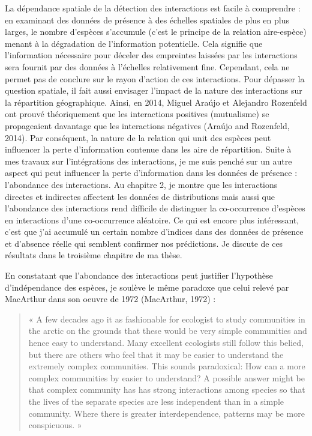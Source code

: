 La dépendance spatiale de la détection des interactions est facile à
comprendre : en examinant des données de présence à des échelles
spatiales de plus en plus larges, le nombre d'espèces s'accumule (c'est
le principe de la relation aire-espèce) menant à la dégradation de
l'information potentielle. Cela signifie que l'information nécessaire
pour déceler des empreintes laissées par les interactions sera fournit
par des données à l'échelles relativement fine. Cependant, cela ne
permet pas de conclure sur le rayon d'action de ces interactions. Pour
dépasser la question spatiale, il fait aussi envisager l'impact de la
nature des interactions sur la répartition géographique. Ainsi, en 2014,
Miguel Araújo et Alejandro Rozenfeld ont prouvé théoriquement que les
interactions positives (mutualisme) se propageaient davantage que les
interactions négatives (Araújo and Rozenfeld, 2014). Par conséquent, la
nature de la relation qui unit des espèces peut influencer la perte
d'information contenue dans les aire de répartition. Suite à mes travaux
sur l'intégrations des interactions, je me suis penché sur un autre
aspect qui peut influencer la perte d'information dans les données de
présence : l'abondance des interactions. Au chapitre 2, je montre que
les interactions directes et indirectes affectent les données de
distributions mais aussi que l'abondance des interactions rend difficile
de distinguer la co-occurrence d'espèces en interactions d'une
co-occurrence aléatoire. Ce qui est encore plus intéressant, c'est que
j'ai accumulé un certain nombre d'indices dans des données de présence
et d'absence réelle qui semblent confirmer nos prédictions. Je discute
de ces résultats dans le troisième chapitre de ma thèse.

En constatant que l'abondance des interactions peut justifier
l'hypothèse d'indépendance des espèces, je soulève le même paradoxe que
celui relevé par MacArthur dans son oeuvre de 1972 (MacArthur, 1972) :

\begin{quote}
« A few decades ago it as fashionable for ecologist to study communities
in the arctic on the grounds that these would be very simple communities
and hence easy to understand. Many excellent ecologists still follow
this belied, but there are others who feel that it may be easier to
understand the extremely complex communities. This sounds paradoxical:
How can a more complex communities by easier to understand? A possible
answer might be that complex community has has strong interactions among
species so that the lives of the separate species are less independent
than in a simple community. Where there is greater interdependence,
patterns may be more conspicuous. »
\end{quote}

